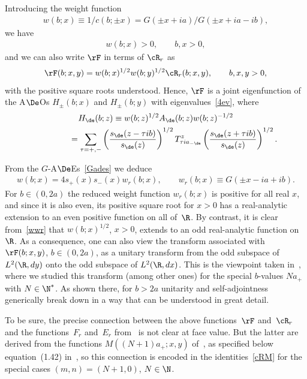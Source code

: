 Introducing the weight function
\begin{gather}\label{w}
w(b;x)\equiv 1/c(b;\pm x)=G(\pm x +ia)/G(\pm x +ia-ib),
\end{gather}
we have
\begin{gather}
w(b;x)>0, \qquad b,x>0,
\end{gather}
and we can also write $\rF$ in terms of $\cR_r$ as
\begin{gather}\label{FR}
\rF(b;x,y) =w(b;x)^{1/2}w(b;y)^{1/2}\cR_r(b;x,y),\qquad b,x,y>0,
\end{gather}
with the positive square roots understood.
Hence, $\rF$ is a joint eigenfunction of the A$\De$Os $H_{\pm}(b;x)$ and
$H_{\pm}(b;y)$
with eigenvalues~\eqref{4ev}, where
\begin{gather} 
H_{\de}(b;z)     \equiv    w(b;z)^{1/2} A_{\de}(b;z)w(b;z)^{-1/2}
\nonumber \\
\label{H} \phantom{H_{\de}(b;z)}{}    =
\sum_{\tau=+,-}\left( \frac{s_{\de}(z-\tau ib)}{s_{\de}(z)}\right)^{1/2}T^z_{\tau ia_{-\de}}\left(\frac{s_{\de}(z+\tau ib)}{s_{\de}(z)}\right)^{1/2}.
\end{gather}

From the $G$-A$\De$Es~\eqref{Gades}
we deduce
\begin{gather}\label{wwr}
w(b;x) =4s_{+}(x)s_{-}(x)w_r(b;x), \qquad w_r(b;x)\equiv G(\pm x -ia+ib).
\end{gather}
For $b\in (0,2a)$ the reduced weight function $w_r(b;x)$ is positive for all real $x$, and since it is also even, its positive square root for $x>0$ has a real-analytic extension to an even positive function on all of~$\R$. By contrast, it is clear from~\eqref{wwr} that $w(b;x)^{1/2}$, $x>0$, extends to an odd real-analytic function on~$\R$. As a consequence, one can also view the transform associated with $\rF(b;x,y)$, $b\in (0,2a)$, as a unitary transform from the odd subspace of $L^2(\R,dy)$ onto the odd subspace of $L^2(\R,dx)$. This is the viewpoint taken in~\cite{Hilb}, where we studied this transform (among other ones) for the special $b$-values $Na_{+}$ with $N\in\N^{*}$. As shown there, for $b>2a$ unitarity and self-adjointness generically break down in a way that can be understood in great detail.

To be sure, the precise connection between the above functions~$\rF$ and~$\cR_r$ and the  functions~$F_r$ and~$E_r$ from~\cite{Hilb} is not clear at face value. But the latter are derived from the functions $M((N+1)a_{+};x,y)$ of~\cite{GLFII}, as specif\/ied below equation~(1.42) in~\cite{Hilb}, so this connection is encoded in the identities~\eqref{cRM} for the special cases $(m,n)=(N+1,0)$, $N\in\N$.

